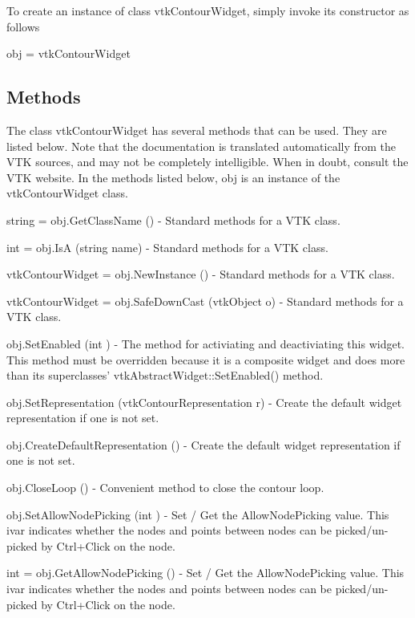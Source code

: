 To create an instance of class vtk\-Contour\-Widget, simply invoke its constructor as follows \begin{DoxyVerb}  obj = vtkContourWidget
\end{DoxyVerb}
 \hypertarget{vtkwidgets_vtkxyplotwidget_Methods}{}\subsection{Methods}\label{vtkwidgets_vtkxyplotwidget_Methods}
The class vtk\-Contour\-Widget has several methods that can be used. They are listed below. Note that the documentation is translated automatically from the V\-T\-K sources, and may not be completely intelligible. When in doubt, consult the V\-T\-K website. In the methods listed below, {\ttfamily obj} is an instance of the vtk\-Contour\-Widget class. 
\begin{DoxyItemize}
\item {\ttfamily string = obj.\-Get\-Class\-Name ()} -\/ Standard methods for a V\-T\-K class.  
\item {\ttfamily int = obj.\-Is\-A (string name)} -\/ Standard methods for a V\-T\-K class.  
\item {\ttfamily vtk\-Contour\-Widget = obj.\-New\-Instance ()} -\/ Standard methods for a V\-T\-K class.  
\item {\ttfamily vtk\-Contour\-Widget = obj.\-Safe\-Down\-Cast (vtk\-Object o)} -\/ Standard methods for a V\-T\-K class.  
\item {\ttfamily obj.\-Set\-Enabled (int )} -\/ The method for activiating and deactiviating this widget. This method must be overridden because it is a composite widget and does more than its superclasses' vtk\-Abstract\-Widget\-::\-Set\-Enabled() method.  
\item {\ttfamily obj.\-Set\-Representation (vtk\-Contour\-Representation r)} -\/ Create the default widget representation if one is not set.  
\item {\ttfamily obj.\-Create\-Default\-Representation ()} -\/ Create the default widget representation if one is not set.  
\item {\ttfamily obj.\-Close\-Loop ()} -\/ Convenient method to close the contour loop.  
\item {\ttfamily obj.\-Set\-Allow\-Node\-Picking (int )} -\/ Set / Get the Allow\-Node\-Picking value. This ivar indicates whether the nodes and points between nodes can be picked/un-\/picked by Ctrl+\-Click on the node.  
\item {\ttfamily int = obj.\-Get\-Allow\-Node\-Picking ()} -\/ Set / Get the Allow\-Node\-Picking value. This ivar indicates whether the nodes and points between nodes can be picked/un-\/picked by Ctrl+\-Click on the node.  

\end{DoxyItemize}
